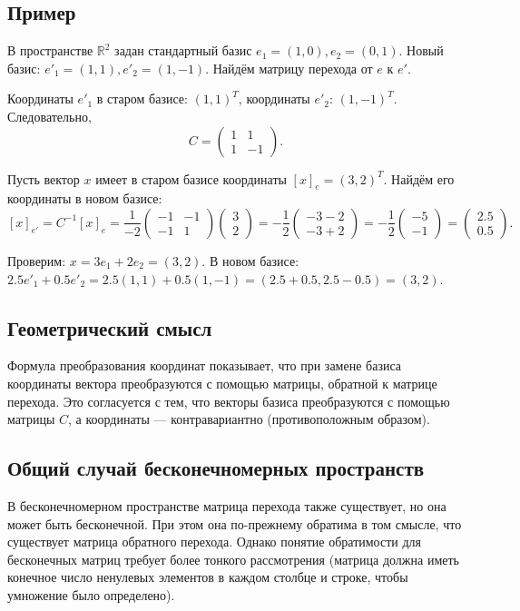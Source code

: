 \documentclass[a4paper,12pt]{article}
\theoremstyle{definition}
\theoremstyle{plain}
\theoremstyle{remark}
\begin{document}
	\subsection{Пример}
	
	В пространстве \( \mathbb{R}^2 \) задан стандартный базис \( e_1 = (1,0), e_2 = (0,1) \). Новый базис: \( e'_1 = (1,1), e'_2 = (1,-1) \). Найдём матрицу перехода от \( e \) к \( e' \).
	
	Координаты \( e'_1 \) в старом базисе: \( (1,1)^T \), координаты \( e'_2 \): \( (1,-1)^T \). Следовательно,
	\[
	C = \begin{pmatrix} 1 & 1 \\ 1 & -1 \end{pmatrix}.
	\]
	
	Пусть вектор \( x \) имеет в старом базисе координаты \( [x]_e = (3,2)^T \). Найдём его координаты в новом базисе:
	\[
	[x]_{e'} = C^{-1} [x]_e = \frac{1}{-2} \begin{pmatrix} -1 & -1 \\ -1 & 1 \end{pmatrix} \begin{pmatrix} 3 \\ 2 \end{pmatrix} = -\frac{1}{2} \begin{pmatrix} -3-2 \\ -3+2 \end{pmatrix} = -\frac{1}{2} \begin{pmatrix} -5 \\ -1 \end{pmatrix} = \begin{pmatrix} 2.5 \\ 0.5 \end{pmatrix}.
	\]
	
	Проверим: \( x = 3e_1 + 2e_2 = (3,2) \). В новом базисе: \( 2.5 e'_1 + 0.5 e'_2 = 2.5(1,1) + 0.5(1,-1) = (2.5+0.5, 2.5-0.5) = (3,2) \).
	
	\subsection{Геометрический смысл}
	
	Формула преобразования координат показывает, что при замене базиса координаты вектора преобразуются с помощью матрицы, обратной к матрице перехода. Это согласуется с тем, что векторы базиса преобразуются с помощью матрицы \( C \), а координаты — контравариантно (противоположным образом).
	
	\subsection{Общий случай бесконечномерных пространств}
	
	В бесконечномерном пространстве матрица перехода также существует, но она может быть бесконечной. При этом она по-прежнему обратима в том смысле, что существует матрица обратного перехода. Однако понятие обратимости для бесконечных матриц требует более тонкого рассмотрения (матрица должна иметь конечное число ненулевых элементов в каждом столбце и строке, чтобы умножение было определено).
	
	
	
	
	
\end{document}
